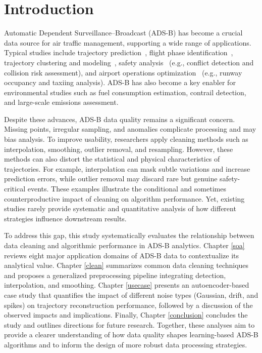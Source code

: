 \section{Introduction}

Automatic Dependent Surveillance–Broadcast (ADS-B) has become a crucial data source for air traffic management, supporting a wide range of applications. Typical studies include trajectory prediction~\cite{wang2021performance,corrado2021clustering}, flight phase identification~\cite{schlosser2024analysis}, trajectory clustering and modeling~\cite{guleriamachine}, safety analysis~\cite{noh2018aviation} (e.g., conflict detection and collision risk assessment), and airport operations optimization~\cite{roosenbrand2023contrail} (e.g., runway occupancy and taxiing analysis). ADS-B has also become a key enabler for environmental studies such as fuel consumption estimation, contrail detection, and large-scale emissions assessment.

Despite these advances, ADS-B data quality remains a significant concern. Missing points, irregular sampling, and anomalies complicate processing and may bias analysis. To improve usability, researchers apply cleaning methods such as interpolation, smoothing, outlier removal, and resampling. However, these methods can also distort the statistical and physical characteristics of trajectories. For example, interpolation can mask subtle variations and increase prediction errors, while outlier removal may discard rare but genuine safety-critical events. These examples illustrate the conditional and sometimes counterproductive impact of cleaning on algorithm performance. Yet, existing studies rarely provide systematic and quantitative analysis of how different strategies influence downstream results.

To address this gap, this study systematically evaluates the relationship between data cleaning and algorithmic performance in ADS-B analytics. Chapter \ref{soa} reviews eight major application domains of ADS-B data to contextualize its analytical value. Chapter \ref{clean}  summarizes common data cleaning techniques and proposes a generalized preprocessing pipeline integrating detection, interpolation, and smoothing. Chapter \ref{usecase} presents an autoencoder-based case study that quantifies the impact of different noise types (Gaussian, drift, and spikes) on trajectory reconstruction performance, followed by a discussion of the observed impacts and implications. Finally, Chapter \ref{conclusion} concludes the study and outlines directions for future research. Together, these analyses aim to provide a clearer understanding of how data quality shapes learning-based ADS-B algorithms and to inform the design of more robust data processing strategies.